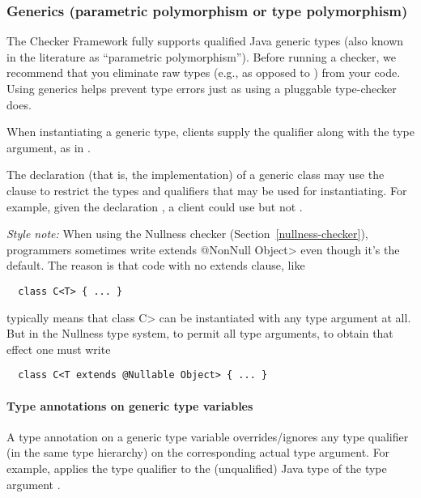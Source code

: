 \subsubsection{Generics (parametric polymorphism or type polymorphism)\label{generics}}

The Checker Framework fully supports 
qualified Java generic types (also known in the literature as ``parametric
polymorphism'').  Before running a checker, we recommend that you eliminate
raw types (e.g.,  as opposed to ) from your code.
Using generics helps prevent type errors just as using a pluggable
type-checker does.

When instantiating a generic type, 
clients supply the qualifier along with the type argument, as in
.

The declaration (that is, the implementation) of a generic class may use
the  clause to restrict the types and qualifiers that may be
used for instantiating.  For example, given the declaration , a client could use
 but not .

\emph{Style note:}
When using the Nullness checker (Section~\ref{nullness-checker}),
programmers sometimes write \<extends @NonNull Object> even though it's the 
default.
The reason is that code with no extends clause, like 

\begin{Verbatim}
  class C<T> { ... }
\end{Verbatim}

typically means that class \<C> can be instantiated with any type argument at
all.  But in the Nullness type system, to permit all type arguments, to
obtain that effect one must write

\begin{Verbatim}
  class C<T extends @Nullable Object> { ... }
\end{Verbatim}


\paragraph{Type annotations on generic type variables}

A type annotation on a generic type variable overrides/ignores any type
qualifier (in the same type hierarchy) on the corresponding actual type
argument.  For example,
 applies the type qualifier  to the
(unqualified) Java type of the type argument .

